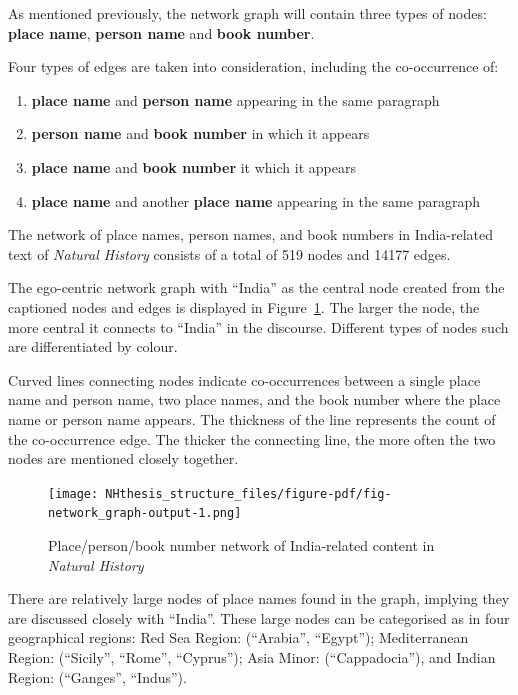\documentclass[
  12pt,
]{article}
\providecommand{\tightlist}{%
  \setlength{\itemsep}{0pt}\setlength{\parskip}{0pt}}\usepackage{longtable,booktabs,array}
\begin{document}
As mentioned previously, the network graph will contain three types of
nodes: \textbf{place name}, \textbf{person name} and \textbf{book
number}.

Four types of edges are taken into consideration, including the
co-occurrence of:

\begin{enumerate}
\def\labelenumi{\arabic{enumi}.}
\tightlist
\item
  \textbf{place name} and \textbf{person name} appearing in the same
  paragraph
\item
  \textbf{person name} and \textbf{book number} in which it appears
\item
  \textbf{place name} and \textbf{book number} it which it appears
\item
  \textbf{place name} and another \textbf{place name} appearing in the
  same paragraph
\end{enumerate}

The network of place names, person names, and book numbers in
India-related text of \emph{Natural History} consists of a total of 519
nodes and 14177 edges.

The ego-centric network graph with ``India'' as the central node created
from the captioned nodes and edges is displayed in
Figure~\ref{fig-network_graph}. The larger the node, the more central it
connects to ``India'' in the discourse. Different types of nodes such
are differentiated by colour.

Curved lines connecting nodes indicate co-occurrences between a single
place name and person name, two place names, and the book number where
the place name or person name appears. The thickness of the line
represents the count of the co-occurrence edge. The thicker the
connecting line, the more often the two nodes are mentioned closely
together.

\begin{figure}

{\centering \texttt{[image: NHthesis\_structure\_files/figure-pdf/fig-network\_graph-output-1.png]}

}

\caption{\label{fig-network_graph}Place/person/book number network of
India-related content in \emph{Natural History}}

\end{figure}

There are relatively large nodes of place names found in the graph,
implying they are discussed closely with ``India''. These large nodes
can be categorised as in four geographical regions: Red Sea Region:
(``Arabia'', ``Egypt''); Mediterranean Region: (``Sicily'', ``Rome'',
``Cyprus''); Asia Minor: (``Cappadocia''), and Indian Region:
(``Ganges'', ``Indus'').
\end{document}
